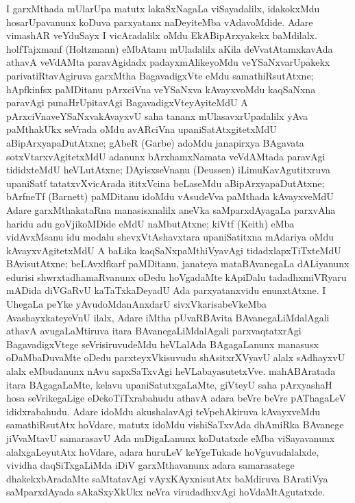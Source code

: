 I garxMthada mUlarUpa matutx lakaSxNagaLa viSayadalilx, idakokxMdu hosa\-rUpa\-vanunx koDuva parxyatanx naDeyiteMba vAdavoMdide. Adare vimashAR veYduSayx I vicAradalilx oMdu EkABipArxyakekx baMdilalx. holfTajxmanf {\rm(Holtzmann)} eMbA\-tanu mUladalilx aKila deVvatAtamxkavAda athavA veVdAMta paravAgidadx padayx\-mAlike\-yoMdu veYSaNxvarUpakekx parivatiRtavAgiruva garxMtha BagavadigxVte eMdu samathiRsu\-tAtxne; hApfkinfsx paMDitanu pArxciVna veYSaNxva kAvayxvoMdu kaqSaNxna paravAgi punaHrUpita\-vAgi BagavadigxVteyAyiteMdU A pArxciVnaveYSaNxvakAvayxvU saha tananx mUlasavxrUpa\-dalilx yAva paMthakUkx seVrada oMdu avARciVna upaniSatAtxgitetxMdU aBipArxya\-paDutAtxne; gAbeR {\rm(Garbe)} adoMdu janapirxya BAgavata sotxVtarxvAgitetxMdU \hbox{adanunx} bArxhamxNamata veVdAMtada paravAgi tididxteMdU heVLutAtxne; DAyisxseVnanu {\rm(Deussen)} iLimuKavAgutitxruva upaniSatf tatatxvXvicArada ititxVcina beLaseMdu aBipArxyapaDutAtxne; bArfneTf {\rm(Barnett)} paMDitanu idoMdu vAsudeVva paMthada kAvayxveMdU Adare garxMthakataRna manasisxnalilx aneVka saMparxdAyagaLa parxvAha haridu adu goVjikoMDide eMdU naMbutAtxne; kiVtf {\rm(Keith)} eMba vidAvxMsanu idu modalu shevxVtAshavxtara upaniSatitxna mAdariya oMdu kAvayxvAgitetxMdU A baLika kaqSaNxpaMthiVyavAgi tidadxlapxTiTxteMdU BAvisutAtxne; beLAvxlfkarf paMDitanu, janateya mataBAvanegaLa dALiyanunx edurisi shwrxtadhamaRvanunx oDedu hoVgadaMte kApiDalu tadadhxmiVRyaru mADida diVGaRvU kaTaTxkaDeyadU Ada parxyatanxvidu enunxtAtxne. I UhegaLa peYke yAvudoMdanAnxdarU sivxVkarisabeVkeMba AvashayxkateyeVnU ilalx, Adare iMtha pUvaRBAvita BAvanegaLiMdalAgali athavA avugaLaMtiruva itara BAvanegaLiMdalAgali parxvaqtatxrAgi BagavadigxVtege seVrisiruvudeMdu heVLalAda BAga\-gaLanunx manasusx oDaMbaDuvaMte oDedu parxteyxVkisuvudu shAsitxrXVyavU alalx sAdhayxvU alalx eMbudanunx nAvu sapxSaTxvAgi heVLabayasutetxVve. mahABAratada itara BAga\-gaLaMte, kelavu upaniSatutxgaLaMte, giVteyU saha pArxyashaH hosa seVrikegaLige eDekoTiTxra\-bahudu athavA adara beVre beVre pAThagaLeV ididxrabahudu. Adare idoMdu akushala\-vAgi teVpehAkiruva kAvayxveMdu samathiRsutAtx hoVdare, matutx idoMdu vishiSaTx\-vAda dhAmiRka BAvanege jiVvaMtavU samarasavU Ada nuDigaLanunx koDutatxde eMba viSayavanunx alalxgaLeyutAtx hoVdare, adara huruLeV keYgeTukade hoVguvudalalxde, vividha daqSiTxgaLiMda iDiV garxMthavanunx adara samarasatege dhakekxbAradaMte saMtata\-vAgi vAyxKAyxnisutAtx baMdiruva BAratiVya saMparxdAyada sAkaSxyXkUkx neVra virudadhxvAgi hoVdaMtAgutatxde.

